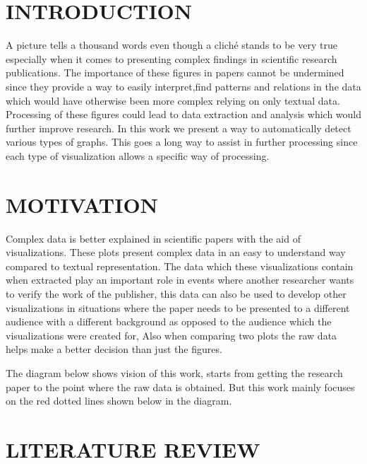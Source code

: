 \documentclass[12pt, a4paper,oneside]{report}
\begin{document}
\chapter{INTRODUCTION}
A picture tells a thousand words even though a cliché stands to be very true especially when it comes to presenting complex findings in scientific research publications. The importance of these figures in papers cannot be undermined since they provide a way to easily interpret,find patterns and relations in the data which would have otherwise been more complex relying on  only textual data. Processing of these figures could lead to data extraction and analysis which would further improve research. In this work we present a way to automatically detect various types of graphs. This goes a long way to assist in further processing since each type of visualization allows a specific way of processing. 


\chapter{MOTIVATION}
Complex data is better explained in scientific papers with the aid of visualizations. These plots present complex data in an easy to understand way compared to textual representation. The data which these visualizations contain when extracted play an important role in events where another researcher wants to verify the work of the publisher, this data can also be used to develop other visualizations in situations where the paper needs to be presented to a different audience with a different background as opposed to the audience which the visualizations were created for, Also when comparing two plots the raw data helps make a better decision than just the figures. 


The diagram below shows vision of this work, starts from getting the research paper to the point
where the raw data is obtained. But this work mainly focuses on the red dotted lines shown below in
the diagram.


\chapter{LITERATURE REVIEW}
\end{document}

